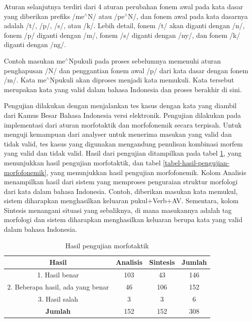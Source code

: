 Aturan selanjutnya terdiri dari 4 aturan perubahan fonem awal pada kata dasar yang diberikan prefiks /me$^{\wedge}$N/ atau /pe$^{\wedge}$N/, dan fonem awal pada kata dasarnya adalah /t/, /p/, /s/, atau /k/. Lebih detail, fonem /t/ akan diganti dengan /n/, fonem /p/ diganti dengan /m/, fonem /s/ diganti dengan /ny/, dan fonem /k/ diganti dengan /ng/.

Contoh masukan me$^{\wedge}$Npukuli pada proses sebelumnya memenuhi aturan penghapusan /N/ dan penggantian fonem awal /p/ dari kata dasar dengan fonem /m/. Kata me$^{\wedge}$Npukuli akan diproses menjadi kata memukuli. Kata tersebut merupakan kata yang valid dalam bahasa Indonesia dan proses berakhir di sini.

Pengujian dilakukan dengan menjalankan tes kasus dengan kata yang diambil dari Kamus Besar Bahasa Indonesia versi elektronik. Pengujian dilakukan pada implementasi dari aturan morfotaktik dan morfofonemik secara terpisah. Untuk menguji kemampuan dari analyser untuk menerima masukan yang valid dan tidak valid, tes kasus yang digunakan mengandung penulisan kombinasi morfem yang valid dan tidak valid. Hasil dari pengujian ditampilkan pada tabel \ref{tabel-hasil-pengujian-morfotaktik}, yang menunjukkan hasil pengujian morfotaktik, dan tabel \ref{tabel-hasil-pengujian-morfofonemik}, yang menunjukkan hasil pengujian morfofonemik. Kolom Analisis menampilkan hasil dari sistem yang memproses penguraian struktur morfologi dari kata dalam bahasa Indonesia. Contoh, diberikan masukan kata memukul, sistem diharapkan menghasilkan keluaran pukul+Verb+AV. Sementara, kolom Sintesis menangani situasi yang sebaliknya, di mana masukannya adalah tag morfologi dan sistem diharapkan menghasilkan keluaran berupa kata yang valid dalam bahasa Indonesia.

\begin{table}[H]
\centering
\begin{tabular}{|c|c|c|c|}
\hline
\textbf{Hasil} & \textbf{Analisis} & \textbf{Sintesis} & \textbf{Jumlah} \\
\hline
1. Hasil benar & 103 & 43 & 146 \\
\hline
2. Beberapa hasil, ada yang benar & 46 & 106 & 152 \\
\hline
3. Hasil salah & 3 & 3 & 6 \\
\hline
\textbf{Jumlah} & 152 & 152 & 308 \\
\hline
\end{tabular}
\caption{Hasil pengujian morfotaktik\cite{manurung:08:indonesian}}
\label{tabel-hasil-pengujian-morfotaktik}
\end{table}

